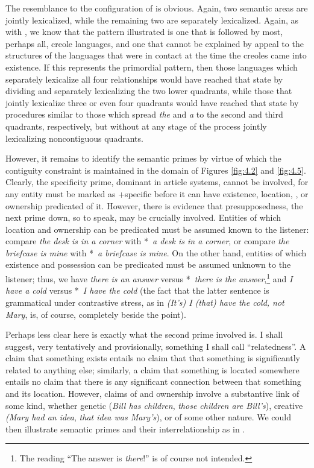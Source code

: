 The resemblance to the configuration of  is obvious. Again, two semantic areas are jointly lexicalized, while the remaining two are separately lexicalized. Again, as with , we know that the pattern illustrated is one that is followed by most, perhaps all, creole languages, and one that cannot be explained by appeal to the structures of the languages that were in contact at the time the creoles came into existence. If this represents the primordial pattern, then those languages which separately lexicalize all four relationships would have reached that state by dividing and separately lexicalizing the two lower quadrants, while those that jointly lexicalize three or even four quadrants would have reached that state by procedures similar to those which spread \textit{the} and \textit{a} to the second and third quadrants, respectively, but without at any stage of the process jointly lexicalizing noncontiguous quadrants.

However, it remains to identify the semantic primes by virtue of which the contiguity constraint is maintained in the domain of Figures \ref{fig:4.2} and \ref{fig:4.5}. Clearly, the specificity prime, dominant in article systems, cannot be involved, for any entity must be marked as +specific before it can have existence, location, , or ownership pre\-dicated of it. However, there is evidence that presupposedness, the next prime down, so to speak, may be crucially involved. Entities of which location and ownership can be predicated must be assumed known to the listener: compare \textit{the desk is in a corner} with *~\textit{a desk is in a corner}, or compare \textit{the briefcase is mine} with *~\textit{a briefcase is mine}. On the other hand, entities of which existence and possession can be predicated must be assumed unknown to the listener; thus, we have \textit{there is an answer} versus *~\textit{there is the answer},\footnote{The reading ``The answer is \textit{there}!'' is of course not intended.} and \textit{I have a cold} versus *~\textit{I have the cold} (the fact that the latter sentence is grammatical under contrastive stress, as in \textit{(It's) I (that) have the cold, not Mary}, is, of course, completely beside the point). 

Perhaps less clear here is exactly what the second prime in\-volved is. I shall suggest, very tentatively and provisionally, something I shall call ``relatedness''.  A claim that something exists entails no claim that that something is significantly related to anything else; similarly, a claim that something is located somewhere entails no claim that there is any significant connection between that something and its location. However, claims of  and ownership involve a substantive link of some kind, whether genetic (\textit{Bill has children}, \textit{those children are Bill's}), creative \textit{(Mary had an idea}, \textit{that idea was Mary's}), or of some other nature. We could then illustrate semantic primes and their interrelationship as in . %

